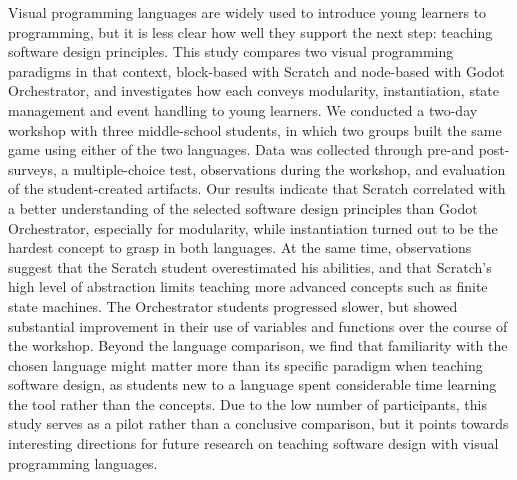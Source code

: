 Visual programming languages are widely used to introduce young learners to programming, but it is less clear how well they support the next step: teaching software design principles.
This study compares two visual programming paradigms in that context, block-based with Scratch and node-based with Godot Orchestrator, and investigates how each conveys modularity, instantiation, state management and event handling to young learners.
We conducted a two-day workshop with three middle-school students, in which two groups built the same game using either of the two languages.
Data was collected through pre-and post-surveys, a multiple-choice test, observations during the workshop, and evaluation of the student-created artifacts.
Our results indicate that Scratch correlated with a better understanding of the selected software design principles than Godot Orchestrator, especially for modularity, while instantiation turned out to be the hardest concept to grasp in both languages.
At the same time, observations suggest that the Scratch student overestimated his abilities, and that Scratch's high level of abstraction limits teaching more advanced concepts such as finite state machines.
The Orchestrator students progressed slower, but showed substantial improvement in their use of variables and functions over the course of the workshop.
Beyond the language comparison, we find that familiarity with the chosen language might matter more than its specific paradigm when teaching software design, as students new to a language spent considerable time learning the tool rather than the concepts.
Due to the low number of participants, this study serves as a pilot rather than a conclusive comparison, but it points towards interesting directions for future research on teaching software design with visual programming languages.
